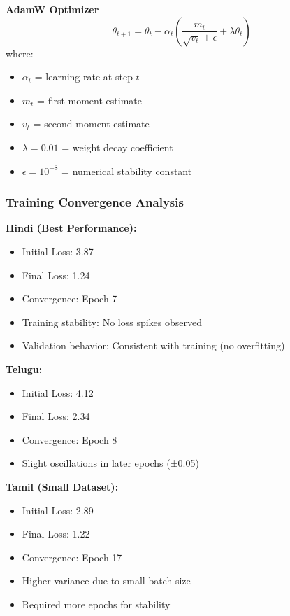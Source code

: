 \documentclass[12pt,a4paper]{article}
\begin{document}
\textbf{AdamW Optimizer}
\begin{equation}
    \theta_{t+1} = \theta_t - \alpha_t \left( \frac{m_t}{\sqrt{v_t} + \epsilon} + \lambda \theta_t \right)
\end{equation}
where:
\begin{itemize}
    \item $\alpha_t$ = learning rate at step $t$
    \item $m_t$ = first moment estimate
    \item $v_t$ = second moment estimate
    \item $\lambda = 0.01$ = weight decay coefficient
    \item $\epsilon = 10^{-8}$ = numerical stability constant
\end{itemize}

\subsubsection{Training Convergence Analysis}

\textbf{Hindi (Best Performance):}
\begin{itemize}
    \item Initial Loss: 3.87
    \item Final Loss: 1.24
    \item Convergence: Epoch 7
    \item Training stability: No loss spikes observed
    \item Validation behavior: Consistent with training (no overfitting)
\end{itemize}

\textbf{Telugu:}
\begin{itemize}
    \item Initial Loss: 4.12
    \item Final Loss: 2.34
    \item Convergence: Epoch 8
    \item Slight oscillations in later epochs (±0.05)
\end{itemize}

\textbf{Tamil (Small Dataset):}
\begin{itemize}
    \item Initial Loss: 2.89
    \item Final Loss: 1.22
    \item Convergence: Epoch 17
    \item Higher variance due to small batch size
    \item Required more epochs for stability
\end{itemize}
\end{document}
